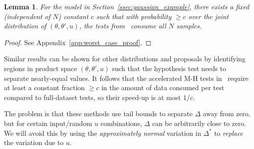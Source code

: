 \documentclass[twoside]{article} \usepackage{aistats2017}
\newtheorem{lemma}{Lemma}
\begin{document}
\begin{lemma}\label{lem:worst_case}
    For the model in Section~\ref{ssec:gaussian_example}, there exists a fixed
    (independent of $N$) constant $c$ such that with probability $\geq c$ over
    the joint distribution of $(\theta, \theta', u)$, the tests
    from~\cite{cutting_mh_2014,icml2014c1_bardenet14} consume all $N$ samples. 
\end{lemma}
\vspace{-1em}
\begin{proof}
See Appendix~\ref{app:worst_case_proof}.
\end{proof}
Similar results can be shown for other distributions and proposals by
identifying regions in product space $(\theta,\theta',u)$ such that the
hypothesis test needs to separate nearly-equal values.  It follows that the
accelerated M-H tests in~\citet{cutting_mh_2014,icml2014c1_bardenet14} require at
least a constant fraction $\geq c$ in the amount of data consumed per test
compared to full-dataset tests, so their speed-up is at most $1/c$.


The problem is that these methods use tail bounds to separate $\Delta$ away
from zero, but for certain input/random $u$ combinations, $\Delta$ can be
arbitrarily close to zero. We will avoid this by using the {\em approximately
normal} variation in $\Delta^*$ to {\em replace} the variation due to $u$. 
\end{document}
